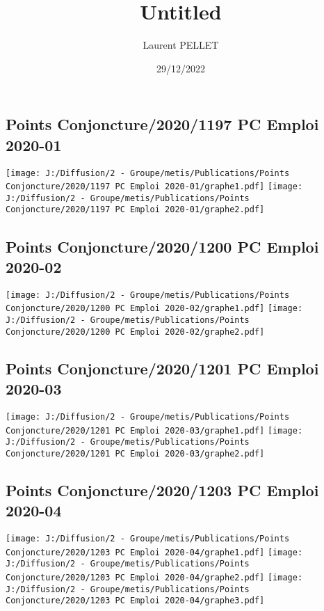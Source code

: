 \documentclass[
]{article}
\title{Untitled}
\author{Laurent PELLET}
\date{29/12/2022}
\begin{document}
\maketitle

\hypertarget{points-conjoncture20201197-pc-emploi-2020-01}{%
\subsection{Points Conjoncture/2020/1197 PC Emploi
2020-01}\label{points-conjoncture20201197-pc-emploi-2020-01}}

\texttt{[image: J:/Diffusion/2 - Groupe/metis/Publications/Points Conjoncture/2020/1197 PC Emploi 2020-01/graphe1.pdf]}
\texttt{[image: J:/Diffusion/2 - Groupe/metis/Publications/Points Conjoncture/2020/1197 PC Emploi 2020-01/graphe2.pdf]}

\hypertarget{points-conjoncture20201200-pc-emploi-2020-02}{%
\subsection{Points Conjoncture/2020/1200 PC Emploi
2020-02}\label{points-conjoncture20201200-pc-emploi-2020-02}}

\texttt{[image: J:/Diffusion/2 - Groupe/metis/Publications/Points Conjoncture/2020/1200 PC Emploi 2020-02/graphe1.pdf]}
\texttt{[image: J:/Diffusion/2 - Groupe/metis/Publications/Points Conjoncture/2020/1200 PC Emploi 2020-02/graphe2.pdf]}

\hypertarget{points-conjoncture20201201-pc-emploi-2020-03}{%
\subsection{Points Conjoncture/2020/1201 PC Emploi
2020-03}\label{points-conjoncture20201201-pc-emploi-2020-03}}

\texttt{[image: J:/Diffusion/2 - Groupe/metis/Publications/Points Conjoncture/2020/1201 PC Emploi 2020-03/graphe1.pdf]}
\texttt{[image: J:/Diffusion/2 - Groupe/metis/Publications/Points Conjoncture/2020/1201 PC Emploi 2020-03/graphe2.pdf]}

\hypertarget{points-conjoncture20201203-pc-emploi-2020-04}{%
\subsection{Points Conjoncture/2020/1203 PC Emploi
2020-04}\label{points-conjoncture20201203-pc-emploi-2020-04}}

\texttt{[image: J:/Diffusion/2 - Groupe/metis/Publications/Points Conjoncture/2020/1203 PC Emploi 2020-04/graphe1.pdf]}
\texttt{[image: J:/Diffusion/2 - Groupe/metis/Publications/Points Conjoncture/2020/1203 PC Emploi 2020-04/graphe2.pdf]}
\texttt{[image: J:/Diffusion/2 - Groupe/metis/Publications/Points Conjoncture/2020/1203 PC Emploi 2020-04/graphe3.pdf]}
\end{document}
